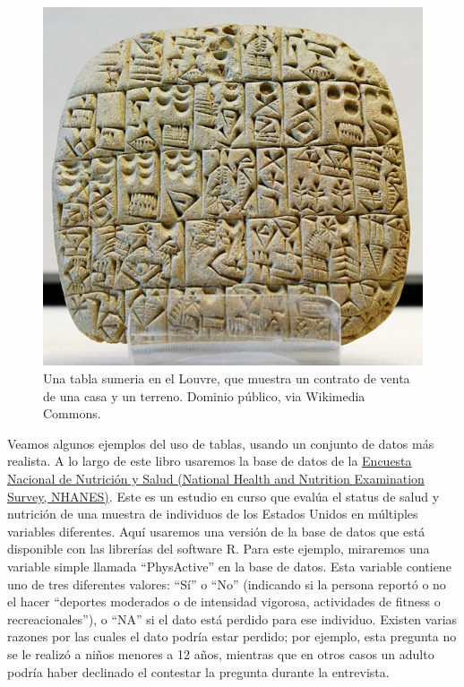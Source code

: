 \documentclass[
  12pt,
]{book}
\theoremstyle{definition}
\theoremstyle{definition}
\theoremstyle{definition}
\theoremstyle{remark}
\begin{document}
\begin{figure}
\includegraphics[width=8in,height=0.3\textheight]{images/Sales_contract_Shuruppak_Louvre_AO3760} \caption{Una tabla sumeria en el Louvre, que muestra un contrato de venta de una casa y un terreno. Dominio público, via Wikimedia Commons.}\label{fig:salesContract}
\end{figure}

Veamos algunos ejemplos del uso de tablas, usando un conjunto de datos más realista. A lo largo de este libro usaremos la base de datos de la \href{https://www.cdc.gov/nchs/nhanes/index.htm}{Encuesta Nacional de Nutrición y Salud (National Health and Nutrition Examination Survey, NHANES)}. Este es un estudio en curso que evalúa el status de salud y nutrición de una muestra de individuos de los Estados Unidos en múltiples variables diferentes. Aquí usaremos una versión de la base de datos que está disponible con las librerías del software R. Para este ejemplo, miraremos una variable simple llamada ``PhysActive'' en la base de datos. Esta variable contiene uno de tres diferentes valores: ``Sí'' o ``No'' (indicando si la persona reportó o no el hacer ``deportes moderados o de intensidad vigorosa, actividades de fitness o recreacionales''), o ``NA'' si el dato está perdido para ese individuo. Existen varias razones por las cuales el dato podría estar perdido; por ejemplo, esta pregunta no se le realizó a niños menores a 12 años, mientras que en otros casos un adulto podría haber declinado el contestar la pregunta durante la entrevista.
\end{document}
